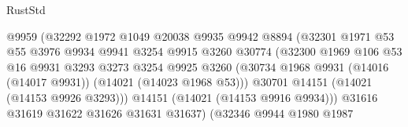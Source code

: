 \begin{lexlean}{RustStd}
\begin{coremodule}
                                        @9959
                                        (@32292
                                          @1972
                                          @1049
                                          @20038
                                          @9935
                                          @9942
                                          @8894
                                          (@32301
                                            @1971
                                            @53
                                            @55
                                            @3976
                                            @9934
                                            @9941
                                            @3254
                                            @9915
                                            @3260
                                            @30774
                                            (@32300
                                              @1969
                                              @106
                                              @53
                                              @16
                                              @9931
                                              @3293
                                              @3273
                                              @3254
                                              @9925
                                              @3260
                                              (@30734
                                                @1968
                                                @9931
                                                (@14016 (@14017 @9931))
                                                (@14021 (@14023 @1968 @53)))
                                              @30701
                                              @14151
                                              (@14021 (@14153 @9926 @3293)))
                                            @14151
                                            (@14021 (@14153 @9916 @9934)))
                                          @31616
                                          @31619
                                          @31622
                                          @31626
                                          @31631
                                          @31637)
                                        (@32346
                                          @9944
                                          @1980
                                          @1987

\end{coremodule}
\end{lexlean}
